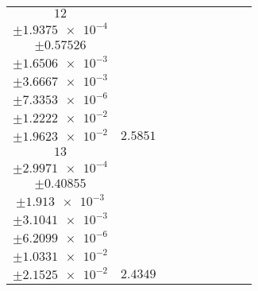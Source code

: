 \documentclass[8pt]{article}
\begin{document}
\begin{longtable}[l]{c c c c c c c c c}
$\num{12}$ & \begin{tabular}[c]{@{}c@{}}$\num{2.9887e-2}$ \\ $\pm\num{1.9375e-4}$\end{tabular} & \begin{tabular}[c]{@{}c@{}}$\num{0.32652}$ \\ $\pm\num{0.57526}$\end{tabular} & \begin{tabular}[c]{@{}c@{}}$\num{6.8088}$ \\ $\pm\num{1.6506e-3}$\end{tabular} & \begin{tabular}[c]{@{}c@{}}$\num{1.4452e+3}$ \\ $\pm\num{3.6667e-3}$\end{tabular} & \begin{tabular}[c]{@{}c@{}}$\num{2.8912}$ \\ $\pm\num{7.3353e-6}$\end{tabular} & \begin{tabular}[c]{@{}c@{}}$\num{1.1855}$ \\ $\pm\num{1.2222e-2}$\end{tabular} & \begin{tabular}[c]{@{}c@{}}$\num{4.0457}$ \\ $\pm\num{1.9623e-2}$\end{tabular} & $\num{2.5851}$\\
$\num{13}$ & \begin{tabular}[c]{@{}c@{}}$\num{2.8841e-2}$ \\ $\pm\num{2.9971e-4}$\end{tabular} & \begin{tabular}[c]{@{}c@{}}$\num{0.31821}$ \\ $\pm\num{0.40855}$\end{tabular} & \begin{tabular}[c]{@{}c@{}}$\num{7.0894}$ \\ $\pm\num{1.913e-3}$\end{tabular} & \begin{tabular}[c]{@{}c@{}}$\num{1.4454e+3}$ \\ $\pm\num{3.1041e-3}$\end{tabular} & \begin{tabular}[c]{@{}c@{}}$\num{2.8916}$ \\ $\pm\num{6.2099e-6}$\end{tabular} & \begin{tabular}[c]{@{}c@{}}$\num{1.1519}$ \\ $\pm\num{1.0331e-2}$\end{tabular} & \begin{tabular}[c]{@{}c@{}}$\num{4.0314}$ \\ $\pm\num{2.1525e-2}$\end{tabular} & $\num{2.4349}$\\

\end{longtable}
\end{document}
